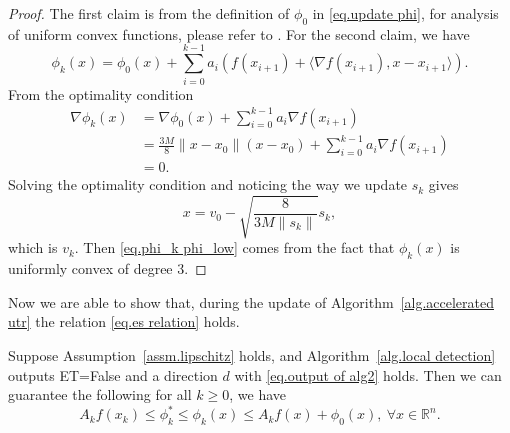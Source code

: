 \documentclass{mcom-l}
\numberwithin{equation}{section}
\begin{document}
\begin{proof}
    The first claim is from the definition of $\phi_0$ in \eqref{eq.update phi}, for analysis of uniform convex functions, please refer to \citet[Section 4.2.2]{nesterov_lectures_2018}. For the second claim, we have
    \begin{equation}
        \label{eq.phi recursive}
        \phi_k(x) = \phi_0(x)+\sum_{i=0}^{k-1}a_i\left (f(x_{i+1})+\langle \nabla f(x_{i+1}),x-x_{i+1}\rangle \right).
    \end{equation}
    From the optimality condition
    \begin{equation*}
        \begin{aligned}
            \nabla \phi_k(x) & = \nabla \phi_0(x)+ \sum_{i=0}^{k-1} a_i\nabla f(x_{i+1})            \\
                             & = \frac{3M}{8}\|x-x_0\|(x-x_0)+\sum_{i=0}^{k-1} a_i\nabla f(x_{i+1}) \\
                             & =0.
        \end{aligned}
    \end{equation*}
    Solving the optimality condition and noticing the way we update $s_k$ gives
    \begin{equation*}
        x = v_0 - \sqrt{\frac{8}{3M\|s_{k}\|}}s_{k},
    \end{equation*}
    which is $v_k$. Then \eqref{eq.phi_k phi_low} comes from the fact that $\phi_k(x)$ is uniformly convex of degree 3.
\end{proof}
Now we are able to show that, during the update of Algorithm~\ref{alg.accelerated utr} the relation \eqref{eq.es relation} holds.
\begin{lemma}\label{lem.estimate sequence}
    Suppose Assumption~\ref{assm.lipschitz} holds, and Algorithm~\ref{alg.local detection} outputs ET=False and a direction $d$ with \eqref{eq.output of alg2} holds. Then we can guarantee the following for all $k\geq 0$, we have
    \begin{equation}
        \label{eq.estimating sequence relation}
        A_k f(x_k)\leq \phi_k^*  \leq \phi_k(x)\leq A_k f(x)+\phi_0(x), \ \forall x\in \mathbb{R}^n.
    \end{equation}
\end{lemma}
\end{document}
